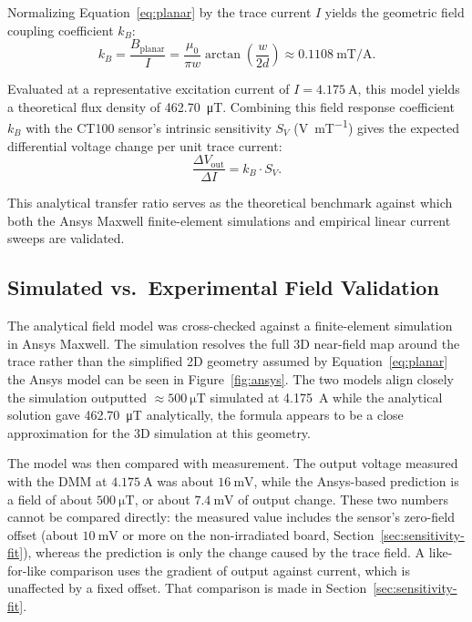 \documentclass[12pt,a4paper]{article}
\begin{document}
Normalizing Equation~\eqref{eq:planar} by the trace current $I$ yields the geometric field coupling coefficient $k_B$:
\begin{equation}
k_B = \frac{B_{\text{planar}}}{I} = \frac{\mu_0}{\pi w} \arctan\left( \frac{w}{2d} \right) \approx \SI{0.1108}{\milli\tesla\per\ampere}.
\label{eq:field-coeff}
\end{equation}

Evaluated at a representative excitation current of \(I = \SI{4.175}{\ampere}\), this model yields a theoretical flux density of \SI{462.70}{\micro\tesla}. Combining this field response coefficient $k_B$ with the CT100 sensor's intrinsic sensitivity $S_V$ (\si{\volt\per\milli\tesla}) gives the expected differential voltage change per unit trace current:
\begin{equation}
\frac{\Delta V_{\text{out}}}{\Delta I} = k_B \cdot S_V.
\label{eq:sensitivity-transfer}
\end{equation}

This analytical transfer ratio serves as the theoretical benchmark against which both the Ansys Maxwell finite-element simulations and empirical linear current sweeps are validated.

\subsection{Simulated vs.\ Experimental Field Validation}
\label{sec:field-validation}

The analytical field model was cross-checked against a finite-element simulation in Ansys Maxwell. The simulation resolves the full 3D near-field map around the trace rather than the simplified 2D geometry assumed by Equation~\eqref{eq:planar} the Ansys model can be seen in  Figure~\ref{fig:ansys}. The two models align closely the simulation outputted \(\approx\SI{500}{\micro\tesla}\) simulated at \SI{4.175}{\ampere} while the analytical solution gave \SI{462.70}{\micro\tesla} analytically, the formula appears to be a close approximation for the 3D simulation at this geometry. 

The model was then compared with measurement. The output voltage measured with the DMM at $\SI{4.175}{\ampere}$ was about $\SI{16}{\milli\volt}$, while the Ansys-based prediction is a field of about $\SI{500}{\micro\tesla}$, or about $\SI{7.4}{\milli\volt}$ of output change. These two numbers cannot be compared directly: the measured value includes the sensor's zero-field offset (about $\SI{10}{\milli\volt}$ or more on the non-irradiated board, Section~\ref{sec:sensitivity-fit}), whereas the prediction is only the change caused by the trace field. A like-for-like comparison uses the gradient of output against current, which is unaffected by a fixed offset. That comparison is made in Section~\ref{sec:sensitivity-fit}.
\end{document}
